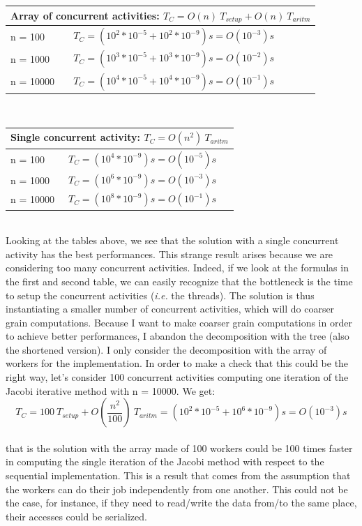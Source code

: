 \documentclass{article}
\begin{document}
\hskip1.60cm
\renewcommand{\arraystretch}{2}
\begin{tabular}[c]{ |l|l| }
  \hline 
  \multicolumn{2}{|c|}{\textbf{Array of concurrent activities}: $ T_C = O(n) \: T_{setup} + O(n) \: T_{aritm}$ } \\[10pt]
  \hline
  n = 100 & $T_C = (10^2 * 10^{-5} + 10^2 * 10^{-9})s = O(10^{-3})s$ \\
   \hline
  n = 1000 & $T_C = (10^3 * 10^{-5} + 10^3 * 10^{-9})s = O(10^{-2})s$  \\
  \hline
  n = 10000 & $T_C = (10^4 * 10^{-5} + 10^4 * 10^{-9})s = O(10^{-1})s$ \\
  \hline 
\end{tabular} \\[15pt]

\hskip1.60cm
\renewcommand{\arraystretch}{2}
\begin{tabular}[c]{ |l|l| }
  \hline 
  \multicolumn{2}{|c|}{\textbf{Single concurrent activity}: $ T_C = O(n^2) \: T_{aritm}$ } \\[10pt]
  \hline
  n = 100 & $T_C = (10^4 * 10^{-9})s = O(10^{-5})s$ \\
   \hline
  n = 1000 & $T_C = (10^6 * 10^{-9})s = O(10^{-3})s$  \\
  \hline
  n = 10000 & $T_C = (10^8 * 10^{-9})s = O(10^{-1})s$ \\
  \hline 
\end{tabular} \\[15pt]
Looking at the tables above, we see that the solution with a single concurrent activity has the best performances. This strange result arises because we are considering too many concurrent activities. Indeed, if we look at the formulas in the first and second table, we can easily recognize that the bottleneck is the time to setup the concurrent activities (\textit{i.e.} the threads). The solution is thus instantiating a smaller number of concurrent activities, which will do coarser grain computations. Because I want to make coarser grain computations in order to achieve better performances, I abandon the decomposition with the tree (also the shortened version). I only consider the decomposition with the array of workers for the implementation. In order to make a check that this could be the right way, let's consider 100 concurrent activities computing one iteration of the Jacobi iterative method with n = 10000. We get:  
\[ T_C = 100 \: T_{setup} + O(\frac {n^2}{100}) \: T_{aritm} = (10^2 * 10^{-5} + 10^6 * 10^{-9})s = O(10^{-3})s \]  \\
that is the solution with the array made of 100 workers could be 100 times faster in computing the single iteration of the Jacobi method with respect to the sequential implementation. This is a result that comes from the assumption that the workers can do their job independently from one another. This could not be the case, for instance, if they need to read/write the data from/to the same place, their accesses could be serialized. 
\end{document}
